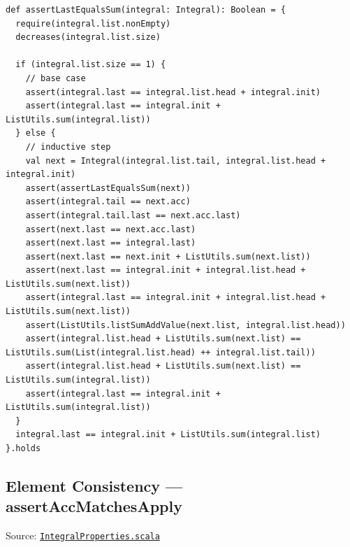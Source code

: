 \begin{lstlisting}[style=scala]
def assertLastEqualsSum(integral: Integral): Boolean = {
  require(integral.list.nonEmpty)
  decreases(integral.list.size)

  if (integral.list.size == 1) {
    // base case
    assert(integral.last == integral.list.head + integral.init)
    assert(integral.last == integral.init + ListUtils.sum(integral.list))
  } else {
    // inductive step
    val next = Integral(integral.list.tail, integral.list.head + integral.init)
    assert(assertLastEqualsSum(next))
    assert(integral.tail == next.acc)
    assert(integral.tail.last == next.acc.last)
    assert(next.last == next.acc.last)
    assert(next.last == integral.last)
    assert(next.last == next.init + ListUtils.sum(next.list))
    assert(next.last == integral.init + integral.list.head + ListUtils.sum(next.list))
    assert(integral.last == integral.init + integral.list.head + ListUtils.sum(next.list))
    assert(ListUtils.listSumAddValue(next.list, integral.list.head))
    assert(integral.list.head + ListUtils.sum(next.list) == ListUtils.sum(List(integral.list.head) ++ integral.list.tail))
    assert(integral.list.head + ListUtils.sum(next.list) == ListUtils.sum(integral.list))
    assert(integral.last == integral.init + ListUtils.sum(integral.list))
  }
  integral.last == integral.init + ListUtils.sum(integral.list)
}.holds
\end{lstlisting}

\subsection{Element Consistency --- assertAccMatchesApply}

Source:
\href{https://github.com/thiagomata/prime-numbers/blob/master/src/main/scala/v1/chapter3/list/integral/properties/IntegralProperties.scala}{\texttt{IntegralProperties.scala}}

